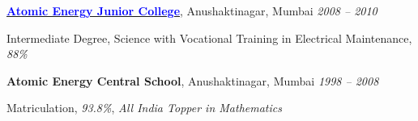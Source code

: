 \documentclass[margin,line]{res}
\newenvironment{list1}{
  \begin{list}{\ding{113}}{%
      \setlength{\itemsep}{0in}
      \setlength{\parsep}{0in} \setlength{\parskip}{0in}
      \setlength{\topsep}{0in} \setlength{\partopsep}{0in}
      \setlength{\leftmargin}{0.17in}}}{\end{list}}
\begin{document}
\begin{resume}
\vspace*{-0.1in}

{\bf \href{http://www.aejcmumbai.ac.in/}{\textcolor{blue}{Atomic Energy Junior College}}}, Anushaktinagar, Mumbai \hfill {\textit{2008 -- 2010}} \\
\vspace*{-.15in}
\begin{list1}
\item[] Intermediate Degree, Science with Vocational Training in Electrical Maintenance, \textit{88\%}
\end{list1}

\vspace*{-0.1in}

{\bf Atomic Energy Central School}, Anushaktinagar, Mumbai \hfill {\textit{1998 -- 2008}} \\
\vspace*{-.15in}
\begin{list1}
\item[] Matriculation, \textit{93.8\%}, \textit{All India Topper in Mathematics}
\end{list1}


\end{resume}
\end{document}
